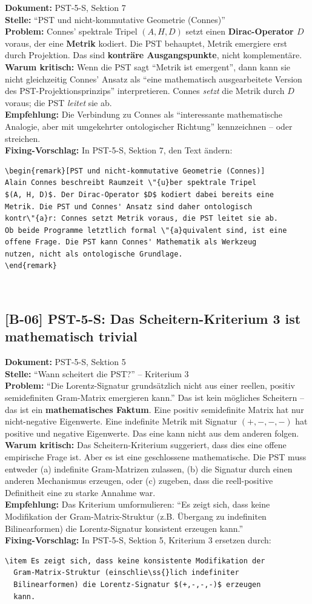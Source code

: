 \documentclass[11pt,a4paper]{article}
\newcommand{\B}[1]{\textbf{[B-#1]}}
\newcommand{\Dok}[1]{\textbf{Dokument:} #1\\}
\newcommand{\Stelle}[1]{\textbf{Stelle:} #1\\}
\newcommand{\Prob}[1]{\textbf{Problem:} #1\\}
\newcommand{\Krit}[1]{\textbf{Warum kritisch:} #1\\}
\newcommand{\Empf}[1]{\textbf{Empfehlung:} #1\\}
\newcommand{\Fix}[1]{\textbf{Fixing-Vorschlag:} #1\\}
\begin{document}
\Dok{PST-5-S, Sektion 7}
\Stelle{``PST und nicht-kommutative Geometrie (Connes)''}
\Prob{Connes' spektrale Tripel $(A, H, D)$ setzt einen
\textbf{Dirac-Operator $D$} voraus, der eine \textbf{Metrik} kodiert.
Die PST behauptet, Metrik emergiere erst durch Projektion. Das sind
\textbf{kontr\"{a}re Ausgangspunkte}, nicht komplement\"{a}re.}
\Krit{Wenn die PST sagt ``Metrik ist emergent'', dann kann sie
nicht gleichzeitig Connes' Ansatz als ``eine mathematisch
ausgearbeitete Version des PST-Projektionsprinzips'' interpretieren.
Connes \emph{setzt} die Metrik durch $D$ voraus; die PST
\emph{leitet} sie ab.}
\Empf{Die Verbindung zu Connes als ``interessante mathematische
Analogie, aber mit umgekehrter ontologischer Richtung''
kennzeichnen -- oder streichen.}
\Fix{In PST-5-S, Sektion 7, den Text \"{a}ndern:
\begin{verbatim}
\begin{remark}[PST und nicht-kommutative Geometrie (Connes)]
Alain Connes beschreibt Raumzeit \"{u}ber spektrale Tripel
$(A, H, D)$. Der Dirac-Operator $D$ kodiert dabei bereits eine
Metrik. Die PST und Connes' Ansatz sind daher ontologisch
kontr\"{a}r: Connes setzt Metrik voraus, die PST leitet sie ab.
Ob beide Programme letztlich formal \"{a}quivalent sind, ist eine
offene Frage. Die PST kann Connes' Mathematik als Werkzeug
nutzen, nicht als ontologische Grundlage.
\end{remark}
\end{verbatim}}

\subsection{\B{06} PST-5-S: Das Scheitern-Kriterium 3 ist mathematisch trivial}

\Dok{PST-5-S, Sektion 5}
\Stelle{``Wann scheitert die PST?'' -- Kriterium 3}
\Prob{``Die Lorentz-Signatur grunds\"{a}tzlich nicht aus einer reellen,
positiv semidefiniten Gram-Matrix emergieren kann.'' Das ist kein
m\"{o}gliches Scheitern -- das ist ein \textbf{mathematisches
Faktum}. Eine positiv semidefinite Matrix hat nur nicht-negative
Eigenwerte. Eine indefinite Metrik mit Signatur $(+,-,-,-)$ hat
positive und negative Eigenwerte. Das eine kann nicht aus dem
anderen folgen.}
\Krit{Das Scheitern-Kriterium suggeriert, dass dies eine offene
empirische Frage ist. Aber es ist eine geschlossene mathematische.
Die PST muss entweder (a) indefinite Gram-Matrizen zulassen, (b)
die Signatur durch einen anderen Mechanismus erzeugen, oder (c)
zugeben, dass die reell-positive Definitheit eine zu starke Annahme
war.}
\Empf{Das Kriterium umformulieren: ``Es zeigt sich, dass keine
Modifikation der Gram-Matrix-Struktur (z.B. \"{U}bergang zu indefiniten
Bilinearformen) die Lorentz-Signatur konsistent erzeugen kann.''}
\Fix{In PST-5-S, Sektion 5, Kriterium 3 ersetzen durch:
\begin{verbatim}
\item Es zeigt sich, dass keine konsistente Modifikation der
  Gram-Matrix-Struktur (einschlie\ss{}lich indefiniter
  Bilinearformen) die Lorentz-Signatur $(+,-,-,-)$ erzeugen
  kann.
\end{verbatim}}
\end{document}
